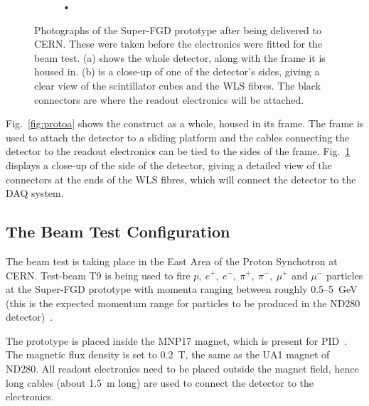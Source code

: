 \documentclass[aps,pra,12pt,notitlepage,tightenlines]{revtex4-1}
\begin{document}
\begin{figure}
\begin{subfigure}{.5\textwidth}
   \caption{•}
   \label{fig:protob}
  \end{subfigure}
  \caption{Photographs of the Super-FGD prototype after being delivered to CERN. These were taken before the electronics were fitted for the beam test. (a) shows the whole detector, along with the frame it is housed in. (b) is a close-up of one of the detector's sides, giving a clear view of the scintillator cubes and the WLS fibres. The black connectors are where the readout electronics will be attached.}
  \label{fig:proto}
 \end{figure}
Fig.\ \ref{fig:protoa} shows the construct as a whole, housed in its frame. The frame is used to attach the detector to a sliding platform and the cables connecting the detector to the readout electronics can be tied to the sides of the frame. Fig.\ \ref{fig:protob} displays a close-up of the side of the detector, giving a detailed view of the connectors at the ends of the WLS fibres, which will connect the detector to the DAQ system.

\subsection{The Beam Test Configuration}
The beam test is taking place in the East Area of the Proton Synchotron at CERN. Test-beam T9 is being used to fire $p, \ e^+, \ e^-, \ \pi^+, \ \pi^-, \ \mu^+$ and $\mu^-$ particles at the Super-FGD prototype with momenta ranging between roughly 0.5--5~GeV (this is the expected momentum range for particles to be produced in the ND280 detector)~\cite{Durieu2001}. 

The prototype is placed inside the MNP17 magnet, which is present for PID~\cite{Brooks2015}. The magnetic flux density is set to 0.2~T, the same as the UA1 magnet of ND280. All readout electronics need to be placed outside the magnet field, hence long cables (about 1.5~m long) are used to connect the detector to the electronics. 
\end{document}
